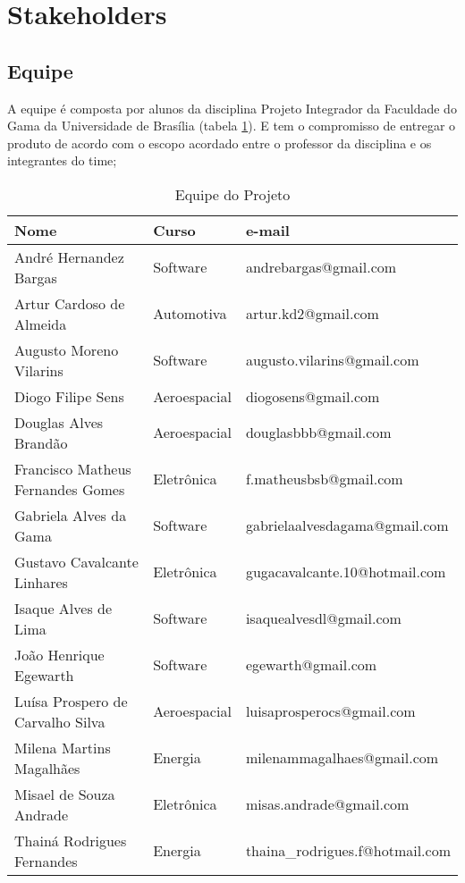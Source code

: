 \section{Stakeholders}
\label{stakeholders}


\subsection{Equipe} A equipe é composta por alunos da disciplina Projeto Integrador da Faculdade do Gama da Universidade de Brasília (tabela \ref{tab:equipe}). E tem o compromisso de entregar o produto de acordo com o escopo acordado entre o professor da disciplina e os integrantes do time;

\begin{table}[H]
\centering
\begin{tabular}{|l|l|l|}
\hline
Nome & Curso & e-mail \\ \hline
    André Hernandez Bargas &    Software   &    andrebargas@gmail.com    \\ \hline
    Artur Cardoso de Almeida &    Automotiva   &    artur.kd2@gmail.com    \\ \hline
    Augusto Moreno Vilarins  &   Software    &    augusto.vilarins@gmail.com    \\ \hline
    Diogo Filipe Sens &     Aeroespacial   &    diogosens@gmail.com    \\ \hline
    Douglas Alves Brandão  &    Aeroespacial   &   douglasbbb@gmail.com     \\ \hline
    Francisco Matheus Fernandes Gomes &   Eletrônica    &    f.matheusbsb@gmail.com    \\ \hline
    Gabriela Alves da Gama &    Software   &    gabrielaalvesdagama@gmail.com    \\ \hline
    Gustavo Cavalcante Linhares &     Eletrônica   &  gugacavalcante.10@hotmail.com      \\ \hline
    Isaque Alves de Lima &   Software    &    isaquealvesdl@gmail.com    \\ \hline
    João Henrique Egewarth &    Software    &    egewarth@gmail.com    \\ \hline
    Luísa Prospero de Carvalho Silva &   Aeroespacial   &    luisaprosperocs@gmail.com    \\ \hline
    Milena Martins Magalhães &   Energia    &    milenammagalhaes@gmail.com    \\ \hline
    Misael de Souza Andrade &     Eletrônica   &    misas.andrade@gmail.com    \\ \hline
    Thainá Rodrigues Fernandes &   Energia    &    thaina_rodrigues.f@hotmail.com    \\ \hline
\end{tabular}
\caption{Equipe do Projeto}
\label{tab:equipe}
\end{table}
    
